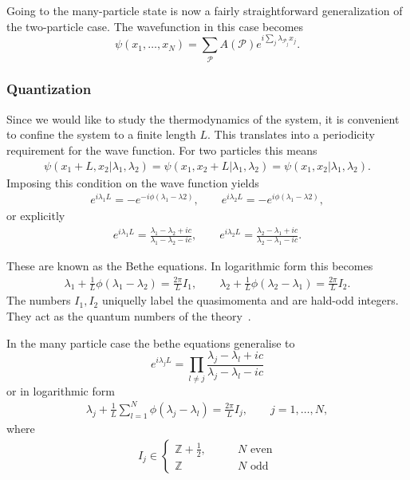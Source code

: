 \documentclass[11pt, a4paper]{report} %
\begin{document}
Going to the many-particle state is now a fairly straightforward generalization of the two-particle case.
The wavefunction in this case becomes~\cite{Franchini2017}
\begin{equation}
	\psi(x_1,\ldots,x_N) = \sum_{\mathcal{P}} A(\mathcal{P}) e^{i\sum_j \lambda_{\mathcal{P}_j} x_j}.
\end{equation}


\subsubsection{Quantization}

Since we would like to study the thermodynamics of the system, it is convenient to confine the system to a finite length \(L\).
This translates into a periodicity requirement for the wave function.
For two particles this means
\begin{align}
	\psi(x_1+L,x_2|\lambda_1,\lambda_2) = \psi(x_1,x_2+L|\lambda_1,\lambda_2) = \psi(x_1,x_2|\lambda_1,\lambda_2).
\end{align}
Imposing this condition on the wave function yields
\begin{align}
  e^{i\lambda_1L} = - e^{-i\phi(\lambda_1 - \lambda2)}, \qquad e^{i\lambda_2L} = - e^{i\phi(\lambda_1 - \lambda2)},
\end{align}
or explicitly~\cite{tofind}
\begin{align}
  e^{i\lambda_1L} = \frac{\lambda_1-\lambda_2 + ic}{\lambda_1-\lambda_2-ic}, \qquad e^{i\lambda_2L} = \frac{\lambda_2-\lambda_1 + ic}{\lambda_2-\lambda_1-ic}.
\end{align}

These are known as the Bethe equations.
In logarithmic form this becomes 
\begin{align}\label{eq:bethe_equations}
  \lambda_1 + \frac{1}{L} \phi(\lambda_1-\lambda_2) = \frac{2\pi}{L} I_1, \qquad \lambda_2 + \frac{1}{L} \phi(\lambda_2-\lambda_1) = \frac{2\pi}{L} I_2.
\end{align}
The numbers \(I_1, I_2\) uniquelly label the quasimomenta and are hald-odd integers. 
They act as the quantum numbers of the theory~\cite{tofind}.

In the many particle case the bethe equations generalise to
\begin{equation}
  e^{i\lambda_jL} = \prod_{l\neq j} \frac{\lambda_j-\lambda_l + ic}{\lambda_j - \lambda_l - ic}
\end{equation}
or in logarithmic form
\begin{align}
  \lambda_j + \frac{1}{L} \sum_{l=1}^N \phi(\lambda_j - \lambda_l) = \frac{2\pi}{L}I_j, \qquad j = 1,\ldots,N,
\end{align}
where~\cite{tofind}
\begin{align}
I_j \in 
\begin{cases}
  \mathbb{Z} + \frac{1}{2}, \qquad &N \textrm{ even}\\
  \mathbb{Z}  &N \textrm{ odd}
\end{cases}
\end{align}
\end{document}
